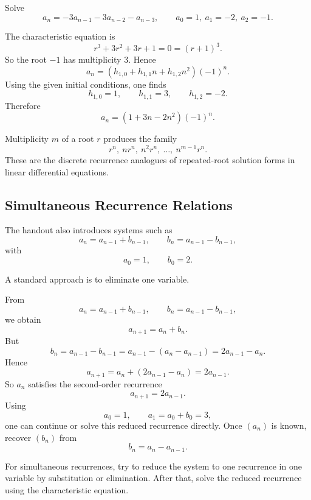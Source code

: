 \begin{examplebox}[title={Optional repeated-root example}]
Solve
\[
a_n=-3a_{n-1}-3a_{n-2}-a_{n-3},
\qquad
a_0=1,\ a_1=-2,\ a_2=-1.
\]

The characteristic equation is
\[
r^3+3r^2+3r+1=0=(r+1)^3.
\]
So the root $-1$ has multiplicity $3$. Hence
\[
a_n=(h_{1,0}+h_{1,1}n+h_{1,2}n^2)(-1)^n.
\]
Using the given initial conditions, one finds
\[
h_{1,0}=1,\qquad h_{1,1}=3,\qquad h_{1,2}=-2.
\]
Therefore
\[
\boxed{a_n=(1+3n-2n^2)(-1)^n.}
\]
\end{examplebox}

\begin{extension}[title={Repeated roots produce polynomial factors}]
Multiplicity $m$ of a root $r$ produces the family
\[
r^n,\ nr^n,\ n^2r^n,\ \dots,\ n^{m-1}r^n.
\]
These are the discrete recurrence analogues of repeated-root solution forms in linear differential equations.
\end{extension}

\subsection{Simultaneous Recurrence Relations}

The handout also introduces systems such as
\[
a_n=a_{n-1}+b_{n-1},
\qquad
b_n=a_{n-1}-b_{n-1},
\]
with
\[
a_0=1,\qquad b_0=2.
\]

A standard approach is to eliminate one variable.

\begin{examplebox}[title={Eliminating one variable in a system}]
From
\[
a_n=a_{n-1}+b_{n-1},
\qquad
b_n=a_{n-1}-b_{n-1},
\]
we obtain
\[
a_{n+1}=a_n+b_n.
\]
But
\[
b_n=a_{n-1}-b_{n-1}=a_{n-1}-(a_n-a_{n-1})=2a_{n-1}-a_n.
\]
Hence
\[
a_{n+1}=a_n+(2a_{n-1}-a_n)=2a_{n-1}.
\]
So $a_n$ satisfies the second-order recurrence
\[
a_{n+1}=2a_{n-1}.
\]
Using
\[
a_0=1,\qquad a_1=a_0+b_0=3,
\]
one can continue or solve this reduced recurrence directly. Once $(a_n)$ is known, recover $(b_n)$ from
\[
b_n=a_n-a_{n-1}.
\]
\end{examplebox}

\begin{examtip}[title={System strategy}]
For simultaneous recurrences, try to reduce the system to one recurrence in one variable by substitution or elimination. After that, solve the reduced recurrence using the characteristic equation.
\end{examtip}

